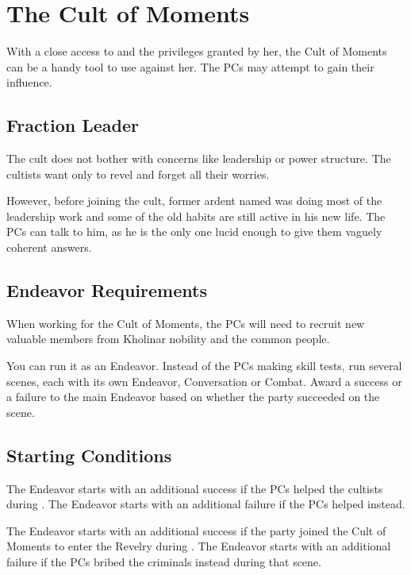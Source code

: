 \section{The Cult of Moments}
\label{sec:theCultOfMoments}

With a close access to \npcQueen{} and the privileges granted by her, the Cult of Moments can be a handy tool to use against her. The PCs may attempt to gain their influence. 


\subsection{Fraction Leader}

The cult does not bother with concerns like leadership or power structure. The cultists want only to revel and forget all their worries.

However, before joining the cult, former ardent named \npcRevelerGuide{} was doing most of the leadership work and some of the old habits are still active in his new life. The PCs can talk to him, as he is the only one lucid enough to give them vaguely coherent answers.




\subsection{Endeavor Requirements}

When working for the Cult of Moments, the PCs will need to recruit new valuable members from Kholinar nobility and the common people.

You can run it as an Endeavor. Instead of the PCs making skill tests, run several scenes, each with its own Endeavor, Conversation or Combat. Award a success or a failure to the main Endeavor based on whether the party succeeded on the scene.




\subsection{Starting Conditions}

The Endeavor starts with an additional success if the PCs helped the cultists during . The Endeavor starts with an additional failure if the PCs helped \npcHighmarshal{} instead.

The Endeavor starts with an additional success if the party joined the Cult of Moments to enter the Revelry during . The Endeavor starts with an additional failure if the PCs bribed the criminals instead during that scene.

